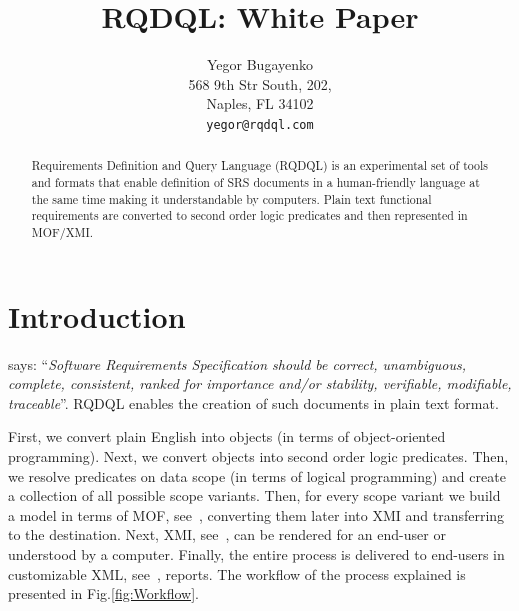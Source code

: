\documentclass[12pt,oneside,letterpaper]{article}
\begin{document}
    \raggedright
    \setlength{\parindent}{0pt}
    \setlength{\parskip}{1em}
    \newcommand{\type}[1]{\colorbox{lightgray}{\texttt{#1}}}
    \newenvironment{maths}
    {
        \vspace*{0.5em}
        \begin{tabular}{l>{\raggedright\arraybackslash}p{20em}}
    }
    {
        \end{tabular}
        \vspace*{1em}
    }


\title{RQDQL: White Paper}
    \author{
        Yegor Bugayenko\\
        568 9th Str South, 202, \\
        Naples, FL 34102\\
        \texttt{yegor@rqdql.com}
    }
    \maketitle
    \begin{abstract}
        Requirements Definition and Query Language (RQDQL) is
        an experimental set of tools and formats that enable definition of
        SRS documents in a
        human-friendly language at the same time making it understandable
        by computers. Plain text functional requirements are converted to
        second order logic predicates and then represented in MOF/XMI.
    \end{abstract}




\section{Introduction}

    \citet{ieee830} says: ``\emph{Software Requirements Specification should be
    correct, unambiguous, complete, consistent, ranked for importance and/or stability,
    verifiable, modifiable, traceable}''. RQDQL enables the creation
    of such documents in plain text format.

    First, we convert plain English into objects (in terms of object-oriented
    programming). Next, we convert objects into second order logic predicates.
    Then, we resolve predicates on data scope (in terms of logical programming)
    and create a collection of all possible scope variants. Then, for every
    scope variant we build a model in terms of MOF, see~\citet{mof2}, converting them later
    into XMI and transferring to the destination. Next, XMI, see~\citet{mof-to-xmi}, can be rendered
    for an end-user or understood by a computer. Finally, the entire process
    is delivered to end-users in customizable XML, see~\citet{xml}, reports.
    The workflow of the process explained is presented in Fig.\ref{fig:Workflow}.
\end{document}
